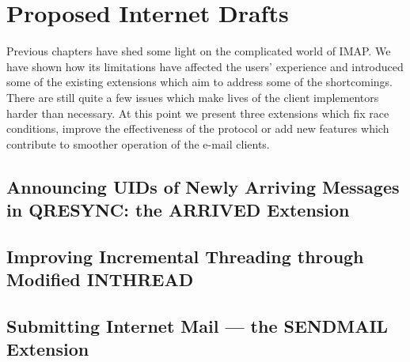 \documentclass[trojita]{subfiles}
\begin{document}
\chapter{Proposed Internet Drafts}

Previous chapters have shed some light on the complicated world of IMAP.  We have shown how its limitations have
affected the users' experience and introduced some of the existing extensions which aim to address some of the
shortcomings.  There are still quite a few issues which make lives of the client implementors harder than necessary.  At
this point we present three extensions which fix race conditions, improve the effectiveness of the protocol or add new
features which contribute to smoother operation of the e-mail clients.

\section{Announcing UIDs of Newly Arriving Messages in QRESYNC: the ARRIVED Extension}
\label{sec:draft-arrived}

\section{Improving Incremental Threading through Modified INTHREAD}
\label{sec:draft-inthread-ext}

\section{Submitting Internet Mail --- the SENDMAIL Extension}
\label{sec:draft-sendmail}
\end{document}
